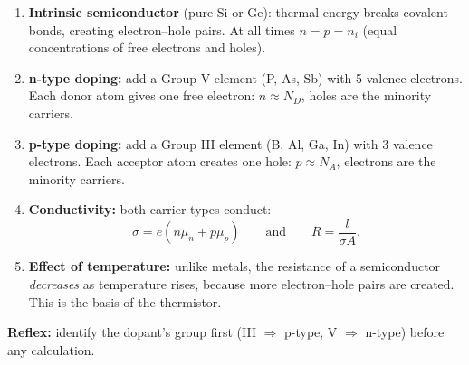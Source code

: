 \documentclass[11pt]{article}
\newcommand{\cle}[1]{{\popxbold\color{popdark}#1}}
\begin{document}
\begin{methode}
\begin{enumerate}
\item \textbf{Intrinsic semiconductor} (pure Si or Ge): thermal energy breaks covalent bonds, creating \cle{electron--hole pairs}. At all times $n = p = n_i$ (equal concentrations of free electrons and holes).
\item \textbf{n-type doping:} add a Group V element (P, As, Sb) with 5 valence electrons. Each donor atom gives one free electron: $n \approx N_D$, holes are the minority carriers.
\item \textbf{p-type doping:} add a Group III element (B, Al, Ga, In) with 3 valence electrons. Each acceptor atom creates one hole: $p \approx N_A$, electrons are the minority carriers.
\item \textbf{Conductivity:} both carrier types conduct:
\[ \sigma = e(n\mu_n + p\mu_p) \qquad\text{and}\qquad R = \dfrac{l}{\sigma A}. \]
\item \textbf{Effect of temperature:} unlike metals, the resistance of a semiconductor \emph{decreases} as temperature rises, because more electron--hole pairs are created. This is the basis of the \cle{thermistor}.
\end{enumerate}
\textbf{Reflex:} identify the dopant's group first (III $\Rightarrow$ p-type, V $\Rightarrow$ n-type) before any calculation.
\end{methode}
\end{document}
